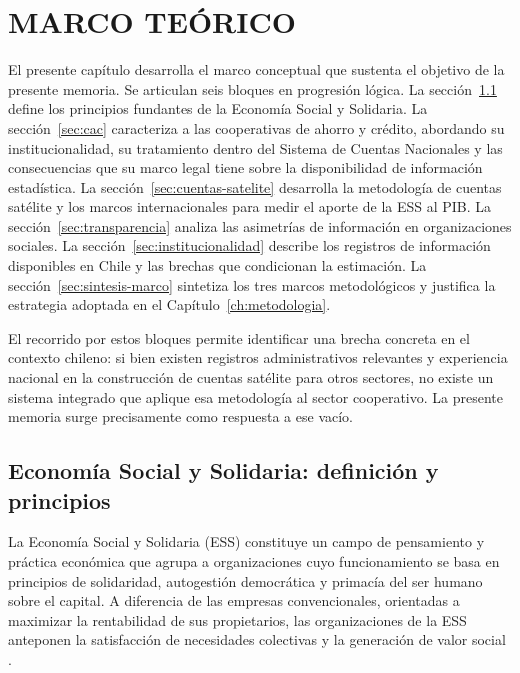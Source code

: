 \chapter{MARCO TEÓRICO}
\label{ch:marco}

El presente capítulo desarrolla el marco conceptual que sustenta el objetivo de la 
presente memoria. Se articulan seis bloques en progresión lógica. La 
sección~\ref{sec:ess} define los principios fundantes de la Economía Social y 
Solidaria. La sección~\ref{sec:cac} caracteriza a las cooperativas de ahorro y 
crédito, abordando su institucionalidad, su tratamiento dentro del Sistema de Cuentas 
Nacionales y las consecuencias que su marco legal tiene sobre la disponibilidad de 
información estadística. La sección~\ref{sec:cuentas-satelite} desarrolla la 
metodología de cuentas satélite y los marcos internacionales para medir el aporte de 
la ESS al PIB. La sección~\ref{sec:transparencia} analiza las asimetrías de 
información en organizaciones sociales. La sección~\ref{sec:institucionalidad} 
describe los registros de información disponibles en Chile y las brechas que 
condicionan la estimación. La sección~\ref{sec:sintesis-marco} sintetiza los tres 
marcos metodológicos y justifica la estrategia adoptada en el 
Capítulo~\ref{ch:metodologia}.

El recorrido por estos bloques permite identificar una brecha concreta en el 
contexto chileno: si bien existen registros administrativos relevantes y 
experiencia nacional en la construcción de cuentas satélite para otros 
sectores, no existe un sistema integrado que aplique esa metodología al 
sector cooperativo. La presente memoria surge precisamente como 
respuesta a ese vacío.


\section{Economía Social y Solidaria: definición y principios}
\label{sec:ess}
La Economía Social y Solidaria (ESS) constituye un campo de pensamiento y práctica 
económica que agrupa a organizaciones cuyo funcionamiento se basa en principios de 
solidaridad, autogestión democrática y primacía del ser humano sobre el capital. A 
diferencia de las empresas convencionales, orientadas a maximizar la rentabilidad de 
sus propietarios, las organizaciones de la ESS anteponen la satisfacción de necesidades 
colectivas y la generación de valor social 
. \\

